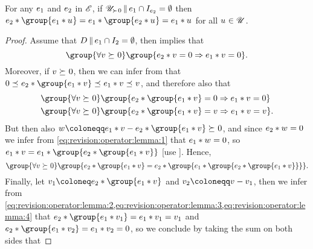 \documentclass[preprint]{isipta2025}
\begin{document}
\begin{lemma}\label{lem:revision:operator}
For any \(\eventopt[1]\) and \(\eventopt[2]\) in \(\eventopts\), if \(\posopts\altcondon{\eventopt[1]}\cap\eventindifset[2]=\emptyset\) then \(\eventopt[2]\ast\group{\eventopt[1]\ast\opt}=\eventopt[1]\ast\group{\eventopt[2]\ast\opt}=\eventopt[1]\ast\opt\) for all \(\opt\in\opts\).
\end{lemma}

\begin{proof}
Assume that \(\desirset\altcondon{\eventopt[1]}\cap\indifset[2]=\emptyset\), then  implies that
\begin{equation}\label{eq:revision:operator:lemma:1}
\group{\forall\altopt\optgeq0}
\group{\eventopt[2]\ast\altopt=0\then\eventopt[1]\ast\altopt=0}.
\end{equation}
Moreover, if \(\altopt\optgeq0\), then we can infer from  that \(0\optleq\eventopt[2]\ast\group{\eventopt[1]\ast\altopt}\optleq\eventopt[1]\ast\altopt\optleq\altopt\), and therefore also that
\begin{align}
\group{\forall\altopt\optgeq0}
&\group{\eventopt[2]\ast\group{\eventopt[1]\ast\altopt}=0\then\eventopt[1]\ast\altopt=0}
\label{eq:revision:operator:lemma:2}\\
\group{\forall\altopt\optgeq0}
&\group{\eventopt[2]\ast\group{\eventopt[1]\ast\altopt}=\altopt\then\eventopt[1]\ast\altopt=\altopt}.
\label{eq:revision:operator:lemma:3}
\end{align}
But then also \(\altopttoo\coloneqq\eventopt[1]\ast\altopt-\eventopt[2]\ast\group{\eventopt[1]\ast\altopt}\optgeq0\), and since \(\eventopt[2]\ast\altopttoo=0\) we infer from \cref{eq:revision:operator:lemma:1} that \(\eventopt[1]\ast\altopttoo=0\), so \(\eventopt[1]\ast\altopt=\eventopt[1]\ast\group{\eventopt[2]\ast\group{\eventopt[1]\ast\altopt}}\) [use ].
Hence,
\begin{equation}\label{eq:revision:operator:lemma:4}
\group{\forall\altopt\optgeq0}
\group{\eventopt[2]\ast\group{\eventopt[1]\ast\altopt}=\eventopt[2]\ast\group{\eventopt[1]\ast\group{\eventopt[2]\ast\group{\eventopt[1]\ast\altopt}}}}.
\end{equation}
Finally, let \(\altopt[1]\coloneq\eventopt[2]\ast\group{\eventopt[1]\ast\altopt}\) and \(\altopt[2]\coloneqq\altopt-\altopt[1]\), then we infer from \cref{eq:revision:operator:lemma:2,eq:revision:operator:lemma:3,eq:revision:operator:lemma:4} that \(\eventopt[2]\ast\group{\eventopt[1]\ast\altopt[1]}=\eventopt[1]\ast\altopt[1]=\altopt[1]\) and \(\eventopt[2]\ast\group{\eventopt[1]\ast\altopt[2]}=\eventopt[1]\ast\altopt[2]=0\), so we conclude by taking the sum on both sides that

\end{proof}
\end{document}
